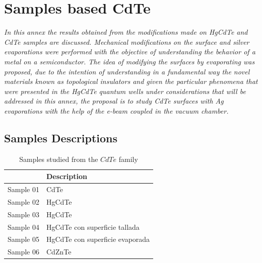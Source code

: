  \chapter{Samples based CdTe}
\label{chap:appendix2}
\textit{In this annex the results obtained from the modifications made on HgCdTe and CdTe samples are discussed. Mechanical modifications on the surface and silver evaporations were performed with the objective of understanding the behavior of a metal on a semiconductor. The idea of modifying the surfaces by evaporating was proposed, due to the intention of understanding in a fundamental way the novel materials known as topological insulators and given the particular phenomena that were presented in the HgCdTe quantum wells under considerations that will be addressed in this annex, the proposal is to study CdTe surfaces with Ag evaporations with the help of the e-beam coupled in the vacuum chamber.}
\vfill
\minitoc
\newpage

\allowdisplaybreaks
\section{Samples Descriptions}
\vspace{-1cm}

\begin{table}[H]
	\centering
	\begin{tabular}{lC}
		\hline
		\hline
		&  Description\\
		\hline
		Sample 01 & CdTe \\
		Sample 02 & HgCdTe\\
		Sample 03 & HgCdTe\\
		Sample 04 & HgCdTe con superficie tallada \\
		Sample 05 & HgCdTe con superficie evaporada\\
		Sample 06 & CdZnTe\\
		\hline
		\hline
	\end{tabular}
	\caption{Samples studied from the $CdTe$ family}
	\label{tab:CH 3 Section 3.1 Photodectors materials}
\end{table}

